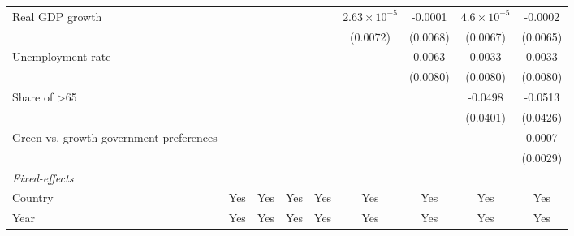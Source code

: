 \begin{table}[htbp]
\begin{tabular}{lcccccccc}
      Real GDP growth                                                        &          &          &                &                 & $2.63\times 10^{-5}$  & -0.0001         & $4.6\times 10^{-5}$  & -0.0002\\   
                                                                             &          &          &                &                 & (0.0072)              & (0.0068)        & (0.0067)             & (0.0065)\\   
      Unemployment rate                                                      &          &          &                &                 &                       & 0.0063          & 0.0033               & 0.0033\\   
                                                                             &          &          &                &                 &                       & (0.0080)        & (0.0080)             & (0.0080)\\   
      Share of >65                                                           &          &          &                &                 &                       &                 & -0.0498              & -0.0513\\   
                                                                             &          &          &                &                 &                       &                 & (0.0401)             & (0.0426)\\   
      Green vs. growth government preferences                                &          &          &                &                 &                       &                 &                      & 0.0007\\   
                                                                             &          &          &                &                 &                       &                 &                      & (0.0029)\\   
      \midrule
      \emph{Fixed-effects}\\
      Country                                                                & Yes      & Yes      & Yes            & Yes             & Yes                   & Yes             & Yes                  & Yes\\  
      Year                                                                   & Yes      & Yes      & Yes            & Yes             & Yes                   & Yes             & Yes                  & Yes\\  

\end{tabular}
\end{table}
